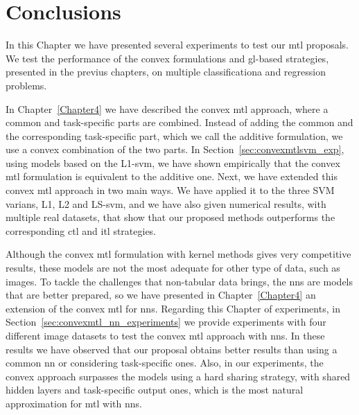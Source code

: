 \section{Conclusions} \label{seq-conclusions}

In this Chapter we have presented several experiments to test our \acrshort{mtl} proposals. We test the performance of the convex formulations and \acrshort{gl}-based strategies, presented in the previus chapters, on multiple classificationa and regression problems.

In Chapter~\ref{Chapter4} we have described the convex \acrshort{mtl} approach, where a common and task-specific parts are combined. Instead of adding the common and the corresponding task-specific part, which we call the additive formulation, we use a convex combination of the two parts.
In Section~\ref{sec:convexmtlsvm_exp}, using models based on the L1-\acrshort{svm}, we have shown empirically that the convex \acrshort{mtl} formulation is equivalent to the additive one. 
Next, we have extended this convex \acrshort{mtl} approach in two main ways. We have applied it to the three SVM varians, L1, L2 and LS-\acrshort{svm}, and we have also given numerical results, with multiple real datasets, that show that our proposed methods outperforms the corresponding \acrshort{ctl} and \acrshort{itl} strategies.

Although the convex \acrshort{mtl} formulation with kernel methods gives very competitive results, these models are not the most adequate for other type of data, such as images. To tackle the challenges that non-tabular data brings, the \acrshort{nns} are models that are better prepared, so we have presented in Chapter~\ref{Chapter4} an extension of the convex \acrshort{mtl} for \acrshort{nns}. 
Regarding this Chapter of experiments, in Section~\ref{sec:convexmtl_nn_experiments} we provide experiments with four different image datasets to test the convex \acrshort{mtl} approach with \acrshort{nns}.
In these results we have observed that our proposal obtains better results than using a common \acrshort{nn} or considering task-specific ones. Also, in our experiments, the convex approach surpasses the models using a hard sharing strategy, with shared hidden layers and task-specific output ones, which is the most natural approximation for \acrshort{mtl} with \acrshort{nns}.

